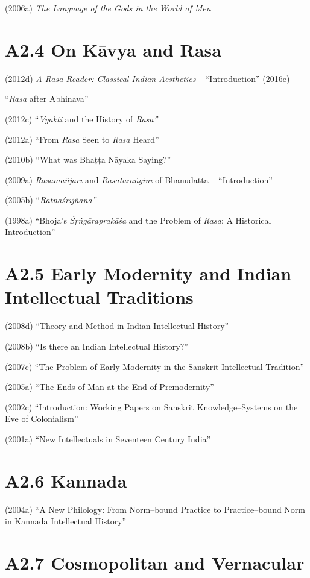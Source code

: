 (2006a) \textit{The Language of the Gods in the World of Men}


\section*{A2.4 On Kāvya and Rasa}

(2012d) \textit{A Rasa Reader: Classical Indian Aesthetics} – “Introduction” (2016e)

“\textit{Rasa} after Abhinava”

(2012c) “\textit{Vyakti} and the History of \textit{Rasa”}

(2012a) “From \textit{Rasa} Seen to \textit{Rasa} Heard”

(2010b) “What was Bhaṭṭa Nāyaka Saying?”

(2009a) \textit{Rasamañjarī} and \textit{Rasataraṅginī} of Bhānudatta – “Introduction”

(2005b) “\textit{Ratnaśrījñāna”}

(1998a) “Bhoja's \textit{Śṛṅgāraprakāśa} and the Problem of \textit{Rasa}: A Historical Introduction”


\section*{A2.5 Early Modernity and Indian Intellectual Traditions}

(2008d) “Theory and Method in Indian Intellectual History”

(2008b) “Is there an Indian Intellectual History?”

(2007c) “The Problem of Early Modernity in the Sanskrit Intellectual Tradition”

(2005a) “The Ends of Man at the End of Premodernity”

(2002c) “Introduction: Working Papers on Sanskrit Knowledge–Systems on the Eve of Colonialism”

(2001a) “New Intellectuals in Seventeen Century India”


\section*{A2.6 Kannada}

(2004a) “A New Philology: From Norm–bound Practice to Practice–bound Norm in Kannada Intellectual History”


\section*{A2.7 Cosmopolitan and Vernacular}

